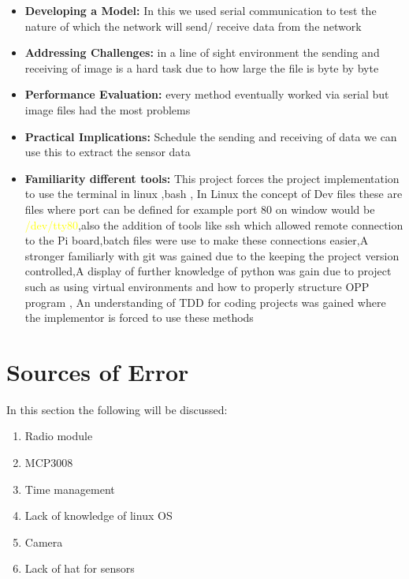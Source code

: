 \begin{itemize}
    \item \textbf{Developing a Model:} In this we used serial communication to test the nature of  which the network will send/ receive data from the network 
    \item \textbf{Addressing Challenges:} in a line of sight environment the sending and receiving of image is a hard task due to  how large the file is byte by byte
    \item \textbf{Performance Evaluation:} every method eventually worked via serial but image files had the  most problems
    \item \textbf{Practical Implications:} Schedule the sending  and  receiving  of data we can use this to extract the sensor data
    \item \textbf{Familiarity  different tools:} This project forces the project implementation to use the terminal in linux ,bash , In Linux the concept of Dev files these are files where port can be defined for example port 80 on window would be \textcolor{yellow}{/dev/tty80},also the addition of tools like ssh which allowed remote connection to the Pi board,batch files were use to make these connections easier,A stronger familiarly with git was gained due to the keeping the project version controlled,A display of further knowledge of python was gain due to  project such as  using virtual environments and  how to properly structure OPP program , An understanding of  TDD for coding projects was gained where the implementor is forced to  use these methods
\end{itemize}
\section{Sources of Error}
In this section the following will be discussed:
\begin{enumerate}
    \item Radio module
    \item MCP3008
    \item Time management
    \item Lack of knowledge of linux OS
    \item Camera
    \item Lack of hat for sensors
\end{enumerate}
